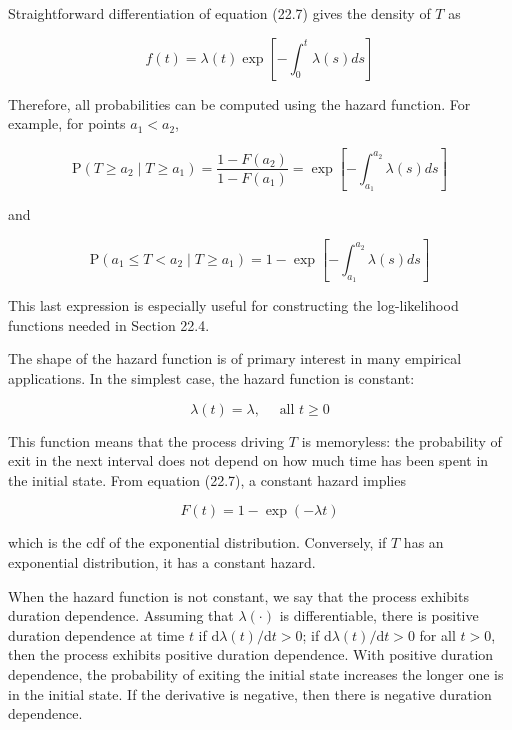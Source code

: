\documentclass[10pt]{article}
\begin{document}
Straightforward differentiation of equation (22.7) gives the density of $T$ as


\begin{equation*}
f(t)=\lambda(t) \exp \left[-\int_{0}^{t} \lambda(s) d s\right] \tag{22.8}
\end{equation*}


Therefore, all probabilities can be computed using the hazard function. For example, for points $a_{1}<a_{2}$,

$$
\mathrm{P}\left(T \geq a_{2} \mid T \geq a_{1}\right)=\frac{1-F\left(a_{2}\right)}{1-F\left(a_{1}\right)}=\exp \left[-\int_{a_{1}}^{a_{2}} \lambda(s) d s\right]
$$

and


\begin{equation*}
\mathrm{P}\left(a_{1} \leq T<a_{2} \mid T \geq a_{1}\right)=1-\exp \left[-\int_{a_{1}}^{a_{2}} \lambda(s) d s\right] \tag{22.9}
\end{equation*}


This last expression is especially useful for constructing the log-likelihood functions needed in Section 22.4.

The shape of the hazard function is of primary interest in many empirical applications. In the simplest case, the hazard function is constant:


\begin{equation*}
\lambda(t)=\lambda, \quad \text { all } t \geq 0 \tag{22.10}
\end{equation*}


This function means that the process driving $T$ is memoryless: the probability of exit in the next interval does not depend on how much time has been spent in the initial state. From equation (22.7), a constant hazard implies


\begin{equation*}
F(t)=1-\exp (-\lambda t) \tag{22.11}
\end{equation*}


which is the cdf of the exponential distribution. Conversely, if $T$ has an exponential distribution, it has a constant hazard.

When the hazard function is not constant, we say that the process exhibits duration dependence. Assuming that $\lambda(\cdot)$ is differentiable, there is positive duration dependence at time $t$ if $\mathrm{d} \lambda(t) / \mathrm{d} t>0$; if $\mathrm{d} \lambda(t) / \mathrm{d} t>0$ for all $t>0$, then the process exhibits positive duration dependence. With positive duration dependence, the probability of exiting the initial state increases the longer one is in the initial state. If the derivative is negative, then there is negative duration dependence.
\end{document}
